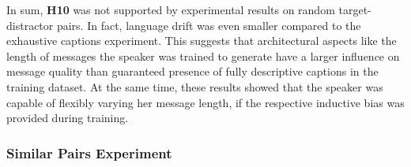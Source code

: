 In sum, \textbf{H10} was not supported by experimental results on random target-distractor pairs. In fact, language drift was even smaller compared to the exhaustive captions experiment. This suggests that architectural aspects like the length of messages the speaker was trained to generate have a larger influence on message quality than guaranteed presence of fully descriptive captions in the training dataset. At the same time, these results showed that the speaker was capable of flexibly varying her message length, if the respective inductive bias was provided during training. 

\subsubsection{Similar Pairs Experiment}
\label{expt:3d_similar}

